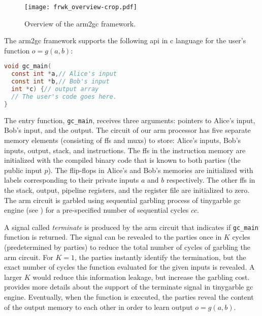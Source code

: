 \begin{figure}
\centering
\texttt{[image: frwk\_overview-crop.pdf]}
\caption{Overview of the \gls{arm2gc} framework.}\label{fig:frwk_overview}
\end{figure}

The \gls{arm2gc} framework supports the following \acrshort{api} in \gls{c} language for the user's function $o = g(a,b)$:
\begin{lstlisting}[language=C,basicstyle=\ttfamily,keywordstyle=\color{blue}\ttfamily,stringstyle=\color{red}\ttfamily,commentstyle=\color{CommentColor}\ttfamily]
void gc_main(
  const int *a,// Alice's input
  const int *b,// Bob's input
  int *c) {// output array
  // The user's code goes here.
}
\end{lstlisting}

The entry function, \texttt{gc\_main}, receives three arguments: pointers to Alice's input, Bob's input, and the output.
The circuit of our \gls{arm} processor has five separate memory elements (consisting of \acrshort{ff}s and \acrshort{mux}s) to store: Alice's inputs, Bob's inputs, output, stack, and instructions.
The \acrshort{ff}s in the instruction memory are initialized with the compiled binary code that is known to both parties (the public input $p$).
The flip-flops in Alice's and Bob's memories are initialized with labels corresponding to their private inputs $a$ and $b$ respectively.
The other \acrshort{ff}s in the stack, output, pipeline registers, and the register file are initialized to zero.
The \gls{arm} circuit is garbled using sequential garbling process of \gls{tinygarble} \acrshort{gc} engine (see ) for a pre-specified number of sequential cycles $cc$.

A signal called \textit{terminate} is produced by the \gls{arm} circuit that indicates if \texttt{gc\_main} function is returned.
The signal can be revealed to the parties once in $K$ cycles (predetermined by parties) to reduce the total number of cycles of garbling the \gls{arm} circuit.
For $K=1$, the parties instantly identify the termination, but the exact number of cycles the function evaluated for the given inputs is revealed.
A larger $K$ would reduce this information leakage, but increase the garbling cost.
 provides more details about the support of the terminate signal in \gls{tinygarble} \acrshort{gc} engine.
Eventually, when the function is executed, the parties reveal the content of the output memory to each other in order to learn output $o = g(a,b)$.

